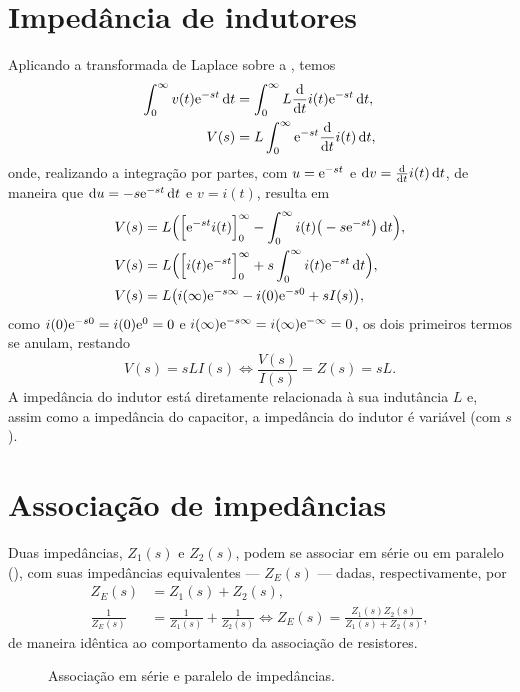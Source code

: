 \section{Impedância de indutores}
Aplicando a transformada de Laplace sobre a , temos
\begin{align*}
	\lt{v(t)}{t}&=\lt{L\diff{i(t)}{t}}{t},\\
	V(s)&=L\intd{\e^{-st}\diff{i(t)}{t}}{t}{0}{\infty},
\end{align*}
onde, realizando a integração por partes, com $u=\e^{-st}$ e $\mathrm{d}v=\diff{i(t)}{t}\,\mathrm{d}t$, de maneira que $\mathrm{d}u=-s\e^{-st}\,\mathrm{d}t$ e $v=i(t)$, resulta em
\begin{align*}
	V(s)&=L\Big(\Big[\e^{-st}i(t)\Big]_0^\infty-\intd{i(t)\big(-s\e^{-st}\big)}{t}{0}{\infty}\Big),\\
	V(s)&=L\Big(\Big[i(t)\e^{-st}\Big]_0^\infty+s\lt{i(t)}{t}\Big),\\
	V(s)&=L\big(i(\infty)\e^{-s\infty}-i(0)\e^{-s0}+sI(s)\big),
\end{align*}
como $i(0)\e^{-s0}=i(0)\e^{0}=0$ e $i(\infty)\e^{-s\infty}=i(\infty)\e^{-\infty}=0$, os dois primeiros termos se anulam, restando
\begin{equation}\label{eq:zL}
	V(s)=sLI(s)\iff\frac{V(s)}{I(s)}=\boxed{Z(s)=sL.}
\end{equation}	
A impedância do indutor está diretamente relacionada à sua indutância $L$ e, assim como a impedância do capacitor, a impedância do indutor é variável (com $s$).

\section{Associação de impedâncias}
Duas impedâncias, $Z_1(s)$ e $Z_2(s)$, podem se associar em série ou em paralelo (), com suas impedâncias equivalentes --- $Z_E(s)$ --- dadas, respectivamente, por
\begin{align}
	Z_E(s)&=Z_1(s)+Z_2(s),\\
	\frac{1}{Z_E(s)}&=\frac{1}{Z_1(s)}+\frac{1}{Z_2(s)}\iff Z_E(s)=\frac{Z_1(s)Z_2(s)}{Z_1(s)+Z_2(s)},
\end{align}
de maneira idêntica ao comportamento da associação de resistores.

\begin{figure}
	\centering
	\caption{Associação em série e paralelo de impedâncias.}
	\label{fig:serieParalelo}
\end{figure}

